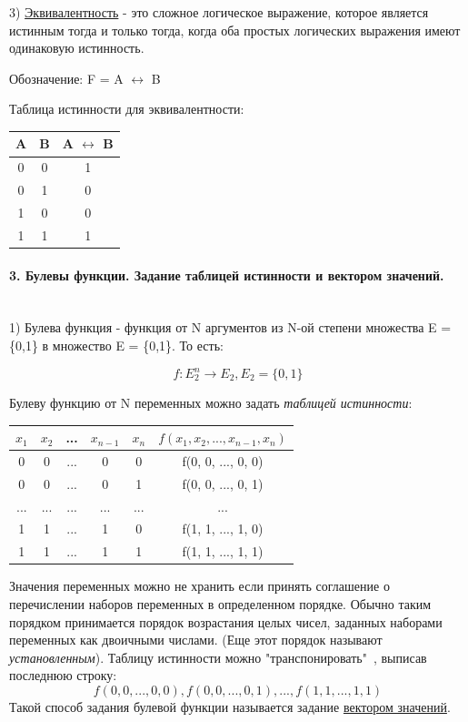 \documentclass[a4paper, 12pt]{article}
\newcommand{\parag}[1]{\paragraph{#1}\mbox{}\\}
\begin{document}
3) \underline{Эквивалентность} - это сложное логическое выражение, которое является истинным тогда и только тогда, когда оба простых логических выражения имеют одинаковую истинность.

Обозначение: F = A $\leftrightarrow$ B 

Таблица истинности для эквивалентности:

\begin{center}
    \begin{tabular}{|c|c|c|}
        \hline
        A & B & A $\leftrightarrow$ B  \\
        \hline
        0 & 0 & 1  \\
         \hline
        0 & 1 & 0  \\
        \hline
        1 & 0 & 0 \\
        \hline
        1 & 1 & 1 \\
        \hline
    \end{tabular}
\end{center}

\parag{3. Булевы функции. Задание таблицей истинности и вектором значений.}
1) Булева функция - функция от N аргументов из N-ой степени множества E = \{0,1\} в множество E = \{0,1\}. То есть:

\[
f: E^{n}_{2} \to E_{2}, E_{2} = \{0, 1\}
\]

Булеву функцию от N переменных можно задать \textit{таблицей истинности}:

\begin{center}
    \begin{tabular}{|c c c c c|c|}
        \hline
        $x_{1}$ & $x_{2}$ & ... & $x_{n-1}$ & $x_{n}$ & $f(x_{1}, x_{2}, ..., x_{n-1}, x_{n})$  \\
        \hline
        0 & 0 & ... & 0 & 0 & f(0, 0, ..., 0, 0)  \\
        0 & 0 & ... & 0 & 1 & f(0, 0, ..., 0, 1)  \\
        ... & ... & ... & ... & ... & ...  \\
        1 & 1 & ... & 1 & 0 & f(1, 1, ..., 1, 0)  \\
        1 & 1 & ... & 1 & 1 & f(1, 1, ..., 1, 1) \\
        \hline
    \end{tabular}
\end{center}

\noindent
Значения переменных можно не хранить если принять соглашение о перечислении наборов переменных в определенном порядке. Обычно таким порядком принимается порядок возрастания целых чисел, заданных наборами переменных как двоичными числами. (Еще этот порядок называют \textit{установленным}). Таблицу истинности можно "транспонировать"\ , выписав последнюю строку:
\[
f(0, 0, ..., 0, 0), f(0, 0, ..., 0, 1), ..., f(1, 1, ..., 1, 1)
\]
Такой способ задания булевой функции называется задание \underline{вектором значений}.
\end{document}
